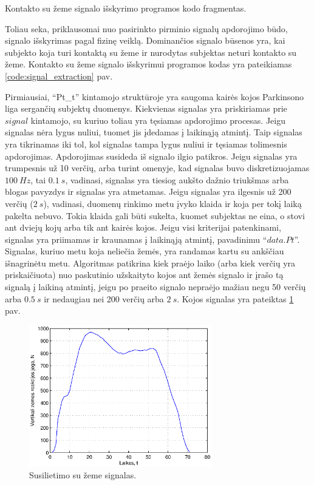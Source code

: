 \documentclass[]{vgtuef}
\begin{document}
\begin{cfigure}
  \centering
  \caption{Kontakto su žeme signalo išskyrimo programos kodo fragmentas.}
  \label{code:signal_extraction}
  
\end{cfigure}

Toliau seka, priklausomai nuo pasirinkto pirminio signalų apdorojimo būdo, signalo išskyrimas pagal fizinę veiklą. Dominančios signalo būsenos yra, kai subjekto koja turi kontaktą su žeme ir nurodytas subjektas neturi kontakto su žeme. Kontakto su žeme signalo išskyrimui programos kodas yra pateikiamas \ref{code:signal_extraction} pav.

Pirmiausiai, ``Pt\_t'' kintamojo struktūroje yra saugoma kairės kojos Parkinsono liga sergančių subjektų duomenys. Kiekvienas signalas yra priskiriamas prie $signal$ kintamojo, su kuriuo toliau yra tęsiamas apdorojimo procesas. Jeigu signalas nėra lygus nuliui, tuomet jis įdedamas į laikinąją atmintį. Taip signalas yra tikrinamas iki tol, kol signalas tampa lygus nuliui ir tęsiamas tolimesnis apdorojimas. Apdorojimas susideda iš signalo ilgio patikros. Jeigu signalas yra trumpesnis už 10 verčių, arba turint omenyje, kad signalas buvo diskretizuojamas $100~Hz$, tai $0.1~s$, vadinasi, signalas yra tiesiog aukšto dažnio triukšmas arba blogas pavyzdys ir signalas yra atmetamas. Jeigu signalas yra ilgesnis už 200 verčių ($2~s$), vadinasi, duomenų rinkimo metu įvyko klaida ir koja per tokį laiką pakelta nebuvo. Tokia klaida gali būti sukelta, kuomet subjektas ne eina, o stovi ant dviejų kojų arba tik ant kairės kojos. Jeigu visi kriterijai patenkinami, signalas yra priimamas ir kraunamas į laikinąją atmintį, pavadinimu ``$data.Pt$''. Signalas, kuriuo metu koja neliečia žemės, yra randamas kartu su ankščiau išnagrinėtu metu. Algoritmas patikrina kiek praėjo laiko (arba kiek verčių yra priskaičiuota) nuo paskutinio užskaityto kojos ant žemės signalo ir įrašo tą signalą į laikiną atmintį, jeigu po praeito signalo nepraėjo mažiau negu 50 verčių arba $0.5~s$ ir nedaugiau nei 200 verčių arba $2~s$. Kojos signalas yra pateiktas \ref{fig:stance_phase} pav.

\begin{figure}[!t]
  \centering
  \includegraphics[width=300px]{figures/09_sample_stance_phase.eps}
  \caption{Susilietimo su žeme signalas.}
  \label{fig:stance_phase}
\end{figure}
\end{document}
